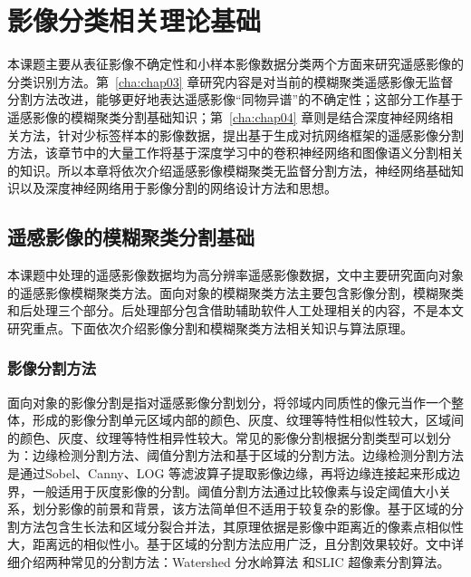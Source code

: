 
\chapter{影像分类相关理论基础}
\label{cha:chap02}

本课题主要从表征影像不确定性和小样本影像数据分类两个方面来研究遥感影像的分类识别方法。第~\ref{cha:chap03} 章研究内容是对当前的模糊聚类遥感影像无监督分割方法改进，能够更好地表达遥感影像“同物异谱”的不确定性；这部分工作基于遥感影像的模糊聚类分割基础知识；第~\ref{cha:chap04} 章则是结合深度神经网络相关方法，针对少标签样本的影像数据，提出基于生成对抗网络框架的遥感影像分割方法，该章节中的大量工作将基于深度学习中的卷积神经网络和图像语义分割相关的知识。所以本章将依次介绍遥感影像模糊聚类无监督分割方法，神经网络基础知识以及深度神经网络用于影像分割的网络设计方法和思想。

\section{遥感影像的模糊聚类分割基础}
\label{sec:chap02-1}
本课题中处理的遥感影像数据均为高分辨率遥感影像数据，文中主要研究面向对象的遥感影像模糊聚类方法。面向对象的模糊聚类方法主要包含影像分割，模糊聚类和后处理三个部分。后处理部分包含借助辅助软件人工处理相关的内容，不是本文研究重点。下面依次介绍影像分割和模糊聚类方法相关知识与算法原理。

\subsection{影像分割方法}
\label{subsec:chap02-1-1}
面向对象的影像分割是指对遥感影像分割划分，将邻域内同质性的像元当作一个整体，形成的影像分割单元区域内部的颜色、灰度、纹理等特性相似性较大，区域间的颜色、灰度、纹理等特性相异性较大。常见的影像分割根据分割类型可以划分为：边缘检测分割方法、阈值分割方法和基于区域的分割方法。边缘检测分割方法是通过Sobel、Canny、LOG 等滤波算子提取影像边缘，再将边缘连接起来形成边界，一般适用于灰度影像的分割。阈值分割方法通过比较像素与设定阈值大小关系，划分影像的前景和背景，该方法简单但不适用于较复杂的影像。基于区域的分割方法包含生长法和区域分裂合并法，其原理依据是影像中距离近的像素点相似性大，距离远的相似性小。基于区域的分割方法应用广泛，且分割效果较好。文中详细介绍两种常见的分割方法：Watershed 分水岭算法\cite{vincent1991watersheds} 和SLIC 超像素分割算法\cite{achanta2012slic}。

